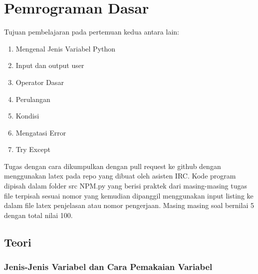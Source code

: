 \chapter{Pemrograman Dasar}
Tujuan pembelajaran pada pertemuan kedua antara lain:
\begin{enumerate}
\item
Mengenal Jenis Variabel Python
\item
Input dan output user
\item
Operator Dasar
\item
Perulangan
\item
Kondisi
\item
Mengatasi Error
\item
Try Except
\end{enumerate}
Tugas dengan cara dikumpulkan dengan pull request ke github dengan menggunakan latex pada repo yang dibuat oleh asisten IRC. Kode program dipisah dalam folder src NPM.py yang berisi praktek dari masing-masing tugas file terpisah sesuai nomor yang kemudian dipanggil menggunakan input listing ke dalam file latex penjelasan atau nomor pengerjaan. Masing masing soal bernilai 5 dengan total nilai 100.

\section{Teori}
\subsection{Jenis-Jenis Variabel dan Cara Pemakaian Variabel}
